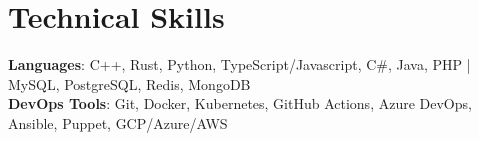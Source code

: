 \section{Technical Skills}
\begin{itemize}[leftmargin=0.15in, label={}]
    \small{\item{
        \textbf{Languages}{: C++, Rust, Python, TypeScript/Javascript, C\#, Java, PHP | MySQL, PostgreSQL, Redis, MongoDB} \\
        \textbf{DevOps Tools}{: Git, Docker, Kubernetes, GitHub Actions, Azure DevOps, Ansible, Puppet, GCP/Azure/AWS} \\
    }}
\end{itemize}
